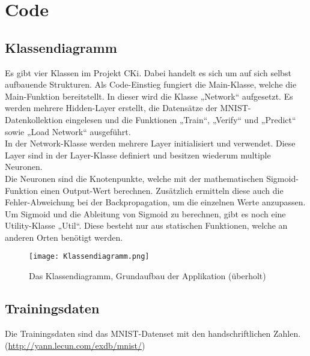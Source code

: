 \section{Code}
\label{sec:DesignCode}
\subsection{Klassendiagramm}
\label{sec:DesignKlassendiagramm}
Es gibt vier Klassen im Projekt CKi. Dabei handelt es sich um auf sich selbst aufbauende Strukturen. Als Code-Einstieg fungiert die Main-Klasse, welche die Main-Funktion bereitstellt. In dieser wird die Klasse „Network“ aufgesetzt. Es werden mehrere Hidden-Layer erstellt, die Datensätze der MNIST-Datenkollektion eingelesen und die Funktionen „Train“, „Verify“ und „Predict“ sowie „Load Network“ ausgeführt. 
\\
In der Network-Klasse werden mehrere Layer initialisiert und verwendet. Diese Layer sind in der Layer-Klasse definiert und besitzen wiederum multiple Neuronen.
\\
Die Neuronen sind die Knotenpunkte, welche mit der mathematischen Sigmoid-Funktion einen Output-Wert berechnen. Zusätzlich ermitteln diese auch die Fehler-Abweichung bei der Backpropagation, um die einzelnen Werte anzupassen.
\\
Um Sigmoid und die Ableitung von Sigmoid zu berechnen, gibt es noch eine Utility-Klasse „Util“. Diese besteht nur aus statischen Funktionen, welche an anderen Orten benötigt werden.


\begin{figure}[H]
	\centering
	\texttt{[image: Klassendiagramm.png]}
	\caption{Das Klassendiagramm, Grundaufbau der Applikation (überholt)}
	\label{fig:designklassendiagramm}
\end{figure}

\subsection{Trainingsdaten}
\label{sec:DesignTrainingsdaten}
Die Trainingsdaten sind das MNIST-Datenset mit den handschriftlichen Zahlen. (\url{http://yann.lecun.com/exdb/mnist/})

